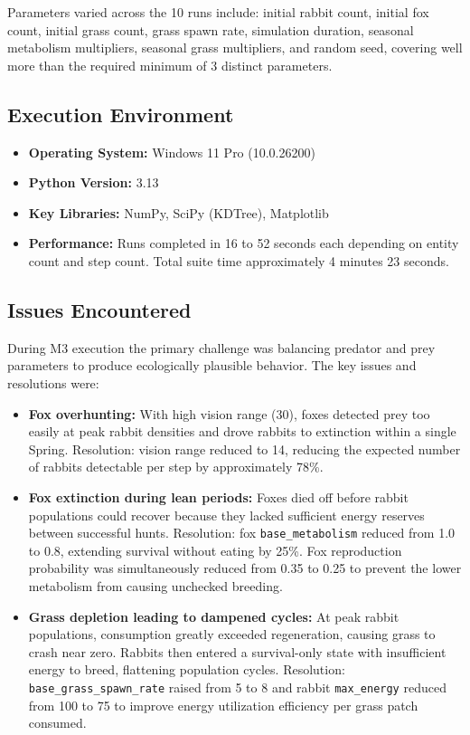 \documentclass[12pt]{article}
\begin{document}
Parameters varied across the 10 runs include: initial rabbit count, initial
fox count, initial grass count, grass spawn rate, simulation duration,
seasonal metabolism multipliers, seasonal grass multipliers, and random seed,
covering well more than the required minimum of 3 distinct parameters.

\subsection{Execution Environment}

\begin{itemize}
    \item \textbf{Operating System:} Windows 11 Pro (10.0.26200)
    \item \textbf{Python Version:} 3.13
    \item \textbf{Key Libraries:} NumPy, SciPy (KDTree), Matplotlib
    \item \textbf{Performance:} Runs completed in 16 to 52 seconds each
    depending on entity count and step count. Total suite time approximately
    4 minutes 23 seconds.
\end{itemize}

\subsection{Issues Encountered}

During M3 execution the primary challenge was balancing predator and prey
parameters to produce ecologically plausible behavior. The key issues and
resolutions were:

\begin{itemize}
    \item \textbf{Fox overhunting:} With high vision range (30), foxes detected
    prey too easily at peak rabbit densities and drove rabbits to extinction
    within a single Spring. Resolution: vision range reduced to 14, reducing
    the expected number of rabbits detectable per step by approximately 78\%.

    \item \textbf{Fox extinction during lean periods:} Foxes died off before
    rabbit populations could recover because they lacked sufficient energy
    reserves between successful hunts. Resolution: fox \texttt{base\_metabolism}
    reduced from 1.0 to 0.8, extending survival without eating by 25\%. Fox
    reproduction probability was simultaneously reduced from 0.35 to 0.25 to
    prevent the lower metabolism from causing unchecked breeding.

    \item \textbf{Grass depletion leading to dampened cycles:} At peak rabbit
    populations, consumption greatly exceeded regeneration, causing grass to
    crash near zero. Rabbits then entered a survival-only state with
    insufficient energy to breed, flattening population cycles. Resolution:
    \texttt{base\_grass\_spawn\_rate} raised from 5 to 8 and rabbit
    \texttt{max\_energy} reduced from 100 to 75 to improve energy utilization
    efficiency per grass patch consumed.
\end{itemize}
\end{document}
